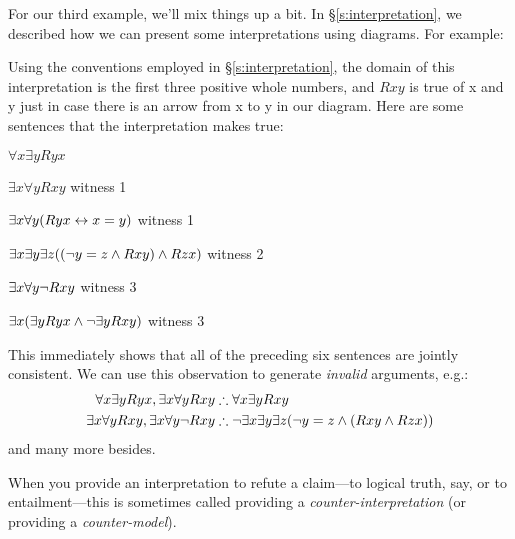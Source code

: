 For our third example, we'll mix things up a bit. In \S\ref{s:interpretation}, we described how we can present some interpretations using diagrams. For example:
\begin{center}
\end{center}
Using the conventions employed in \S\ref{s:interpretation}, the domain of this interpretation is the first three positive whole numbers, and $Rxy$ is true of x and y just in case there is an arrow from x to y in our diagram. Here are some sentences that the interpretation makes true:
	\begin{ebullet}
		\item $\forall x \exists y Ryx$
		\item $\exists x \forall y Rxy$ \hfill witness 1
		\item $\exists x \forall y (Ryx \leftrightarrow x = y)$ \hfill witness 1
		\item $\exists x \exists y \exists z ((\neg y = z \mathbin{\wedge} Rxy) \mathbin{\wedge} Rzx)$ \hfill witness 2
		\item $\exists x \forall y \neg Rxy$ \hfill witness 3
		\item $\exists x (\exists y Ryx \mathbin{\wedge} \neg \exists y Rxy)$ \hfill witness 3
	\end{ebullet}
This immediately shows that all of the preceding six sentences are jointly consistent. We can use this observation to generate \emph{invalid} arguments, e.g.:
	\begin{align*}
		\forall x \exists y Ryx, \exists x \forall y Rxy  &\therefore  \forall x \exists y Rxy\\
		\exists x \forall y Rxy, \exists x \forall y \enot Rxy & \therefore \enot \exists x \exists y \exists z (\enot y = z \eand (Rxy \eand Rzx))
	\end{align*}
and many more besides.

When you provide an interpretation to refute a claim---to logical truth, say, or to entailment---this is sometimes called providing a \emph{counter-interpretation} (or providing a \emph{counter-model}).

